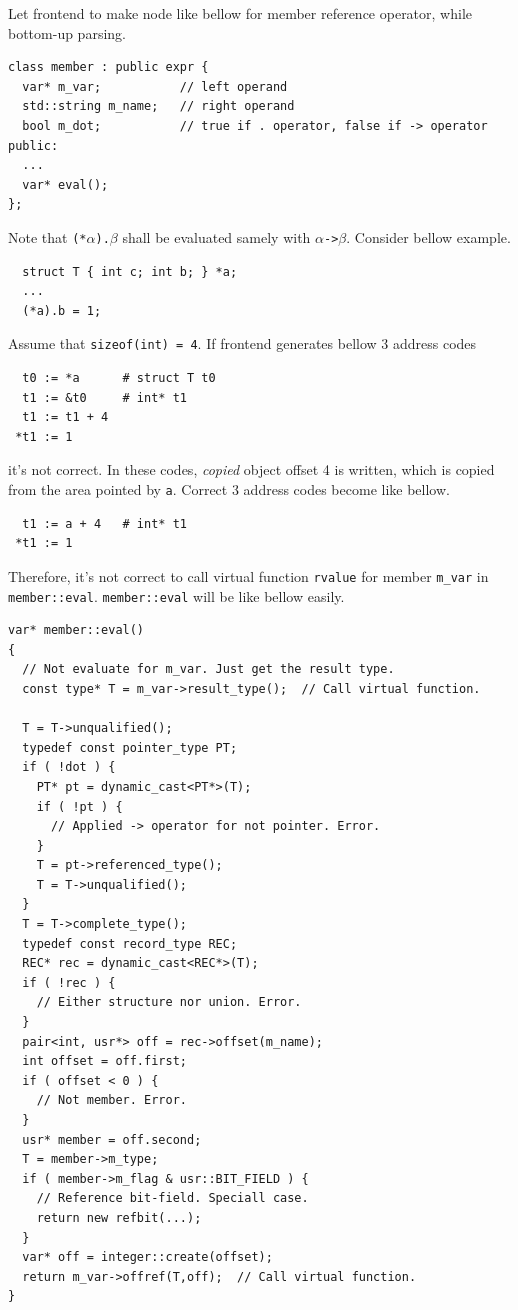 Let frontend to make node like bellow for member reference operator,
while bottom-up parsing.
\begin{verbatim}
class member : public expr {
  var* m_var;           // left operand
  std::string m_name;   // right operand
  bool m_dot;           // true if . operator, false if -> operator
public:
  ...
  var* eval();
};
\end{verbatim}
Note that {\tt{(*$\alpha$).$\beta$}} shall be evaluated
samely with {\tt{$\alpha$->$\beta$}}.
Consider bellow example.
\begin{verbatim}
  struct T { int c; int b; } *a;
  ...
  (*a).b = 1;
\end{verbatim}
Assume that {\tt{sizeof(int) = 4}}. If frontend generates bellow
3 address codes
\begin{verbatim}
  t0 := *a      # struct T t0
  t1 := &t0     # int* t1
  t1 := t1 + 4
 *t1 := 1
\end{verbatim}
it's not correct. In these codes, {\em copied} object offset 4
is written, which is copied from the area pointed by {\tt{a}}.
Correct 3 address codes become like bellow.
\begin{verbatim}
  t1 := a + 4   # int* t1
 *t1 := 1
\end{verbatim}
Therefore, it's not correct to call virtual function {\tt{rvalue}}
for member {\tt{m\_var}} in {\tt{member::eval}}.
{\tt{member::eval}} will be like bellow easily.
\begin{verbatim}
var* member::eval()
{
  // Not evaluate for m_var. Just get the result type.
  const type* T = m_var->result_type();  // Call virtual function.

  T = T->unqualified();
  typedef const pointer_type PT;
  if ( !dot ) {
    PT* pt = dynamic_cast<PT*>(T);
    if ( !pt ) {
      // Applied -> operator for not pointer. Error.
    }
    T = pt->referenced_type();
    T = T->unqualified();
  }
  T = T->complete_type();
  typedef const record_type REC;
  REC* rec = dynamic_cast<REC*>(T);
  if ( !rec ) {
    // Either structure nor union. Error.
  }
  pair<int, usr*> off = rec->offset(m_name);
  int offset = off.first;
  if ( offset < 0 ) {
    // Not member. Error.
  }
  usr* member = off.second;
  T = member->m_type;
  if ( member->m_flag & usr::BIT_FIELD ) {
    // Reference bit-field. Speciall case.
    return new refbit(...);
  }
  var* off = integer::create(offset);
  return m_var->offref(T,off);  // Call virtual function.
}
\end{verbatim}

